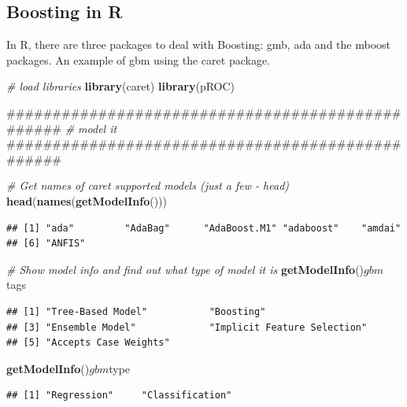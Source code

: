 \documentclass[]{book}
\newenvironment{Shaded}{\begin{snugshade}}{\end{snugshade}}
\newcommand{\KeywordTok}[1]{\textcolor[rgb]{0.13,0.29,0.53}{\textbf{{#1}}}}
\newcommand{\CommentTok}[1]{\textcolor[rgb]{0.56,0.35,0.01}{\textit{{#1}}}}
\newcommand{\NormalTok}[1]{{#1}}
\begin{document}
\subsection{Boosting in R}\label{boosting-in-r}

In R, there are three packages to deal with Boosting: gmb, ada and the
mboost packages. An example of gbm using the caret package.

\begin{Shaded}
\begin{Highlighting}[]
\CommentTok{# load libraries}
\KeywordTok{library}\NormalTok{(caret)}
\KeywordTok{library}\NormalTok{(pROC)}

\NormalTok{#################################################}
\CommentTok{# model it}
\NormalTok{#################################################}

\CommentTok{# Get names of caret supported models (just a few - head)}
\KeywordTok{head}\NormalTok{(}\KeywordTok{names}\NormalTok{(}\KeywordTok{getModelInfo}\NormalTok{()))}
\end{Highlighting}
\end{Shaded}

\begin{verbatim}
## [1] "ada"         "AdaBag"      "AdaBoost.M1" "adaboost"    "amdai"      
## [6] "ANFIS"
\end{verbatim}

\begin{Shaded}
\begin{Highlighting}[]
\CommentTok{# Show model info and find out what type of model it is}
\KeywordTok{getModelInfo}\NormalTok{()$gbm$tags}
\end{Highlighting}
\end{Shaded}

\begin{verbatim}
## [1] "Tree-Based Model"           "Boosting"                  
## [3] "Ensemble Model"             "Implicit Feature Selection"
## [5] "Accepts Case Weights"
\end{verbatim}

\begin{Shaded}
\begin{Highlighting}[]
\KeywordTok{getModelInfo}\NormalTok{()$gbm$type}
\end{Highlighting}
\end{Shaded}

\begin{verbatim}
## [1] "Regression"     "Classification"
\end{verbatim}
\end{document}
